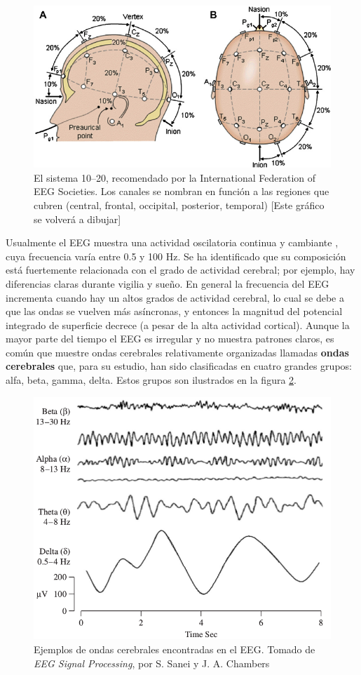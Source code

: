 \documentclass[12pt,a4paper]{mitthesis}
\begin{document}
\begin{figure}
\centering
\includegraphics[width=0.9\linewidth]{Fig.png} 
\caption{El sistema 10--20, recomendado por la
International Federation of EEG Societies. Los canales se nombran en funci\'on a las regiones que 
cubren (central, frontal, occipital, posterior, temporal)
[Este gr\'afico se volver\'a a dibujar]
}
\label{img1020}
\end{figure}

Usualmente el EEG muestra una actividad oscilatoria continua y cambiante 
\cite{Clark98},
cuya frecuencia var\'ia entre 0.5 y 100 Hz.
Se ha
identificado que su composici\'on est\'a fuertemente relacionada con el grado de actividad 
cerebral; por ejemplo, hay diferencias claras durante vigilia y sue\~no.
En general la frecuencia del EEG incrementa cuando hay un altos grados 
de actividad cerebral, lo cual se debe a que las ondas se vuelven m\'as as\'incronas, y entonces 
la magnitud del  potencial integrado de superficie decrece (a pesar de la alta actividad cortical).
Aunque la mayor parte del tiempo el EEG es irregular y no muestra patrones claros, es com\'un que 
muestre ondas cerebrales relativamente organizadas llamadas \textbf{ondas cerebrales} que, 
para su estudio, han sido clasificadas en 
cuatro grandes grupos: alfa, beta, gamma, delta.
Estos grupos son ilustrados en la figura \ref{ritmos}.

\begin{figure}
\centering
\includegraphics[width=0.55\linewidth]{ritmos.png} 
\caption{Ejemplos de ondas cerebrales encontradas en el EEG. Tomado de 
\textit{EEG Signal Processing}, por S. Sanei y J. A. Chambers \cite{Sanei07}
}
\label{ritmos}
\end{figure}
\end{document}
